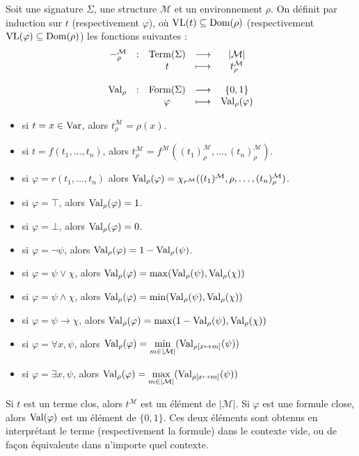\begin{definition}
  Soit une signature $\Sigma$, une structure $\mathcal M$ et un environnement
  $\rho$. On définit par induction sur $t$ (respectivement $\varphi$), où
  $\operatorname{VL}(t)\subseteq\operatorname{Dom}(\rho)$ (respectivement $\operatorname{VL}(\varphi)\subseteq\operatorname{Dom}(\rho)$)
  les fonctions suivantes :
  \[\begin{array}{rcccc}
  -_\rho^\mathcal M & : & \operatorname{Term}(\Sigma) & \longrightarrow & |\mathcal M|\\
  & & t & \longmapsto & t^{\mathcal M}_\rho\\
  \\
  \operatorname{Val}_\rho & : & \operatorname{Form}(\Sigma) & \longrightarrow & \{0,1\}\\
  & & \varphi & \longmapsto & \operatorname{Val}_\rho(\varphi)
  \end{array}\]

  \begin{itemize}
  \item si $t = x \in \operatorname{Var}$, alors $t^\mathcal M_\rho = \rho(x)$.
  \item si $t = f(t_1,\ldots,t_n)$, alors
    $t_\rho^\mathcal M =
    f^\mathcal M((t_1)^\mathcal M_\rho,\ldots,(t_n)^\mathcal M_\rho)$.
  \item si $\varphi = r(t_1,\ldots,t_n)$ alors
    $\operatorname{Val}_\rho(\varphi) =
    \chi_{r^\mathcal M}((t_1)^\mathcal M,\rho,\ldots,(t_n)^\mathcal M_\rho)$.
  \item si $\varphi = \top$, alors $\operatorname{Val}_\rho(\varphi) = 1$.
  \item si $\varphi = \bot$, alors $\operatorname{Val}_\rho(\varphi) = 0$.
  \item si $\varphi = \lnot \psi$, alors
    $\operatorname{Val}_\rho(\varphi) = 1 - \operatorname{Val}_\rho(\psi)$.
  \item si $\varphi = \psi \lor \chi$, alors
    $\operatorname{Val}_\rho(\varphi) = \max(\operatorname{Val}_\rho(\psi),\operatorname{Val}_\rho(\chi))$
  \item si $\varphi = \psi \land \chi$, alors
    $\operatorname{Val}_\rho(\varphi) = \min(\operatorname{Val}_\rho(\psi),\operatorname{Val}_\rho(\chi))$
  \item si $\varphi = \psi \to \chi$, alors
    $\operatorname{Val}_\rho(\varphi) = \max(1 - \operatorname{Val}_\rho(\psi),\operatorname{Val}_\rho(\chi))$
  \item si $\varphi = \forall x, \psi$, alors
    $\displaystyle\operatorname{Val}_\rho(\varphi) =
    \min_{m \in |\mathcal M|}(\operatorname{Val}_{\rho[x\mapsto m]}(\psi))$
  \item si $\varphi = \exists x, \psi$, alors
    $\displaystyle\operatorname{Val}_\rho(\varphi) =
    \max_{m \in |\mathcal M|}(\operatorname{Val}_{\rho[x\mapsto m]}(\psi))$
  \end{itemize}
  
  Si $t$ est un terme clos, alors $t^{\mathcal M}$ est un élément de
  $|\mathcal M|$. Si $\varphi$ est une formule close, alors $\operatorname{Val}(\varphi)$ est
  un élément de $\{0,1\}$. Ces deux éléments sont obtenus en interprétant le
  terme (respectivement la formule) dans le contexte vide, ou de façon
  équivalente dans n'importe quel contexte.
\end{definition}

